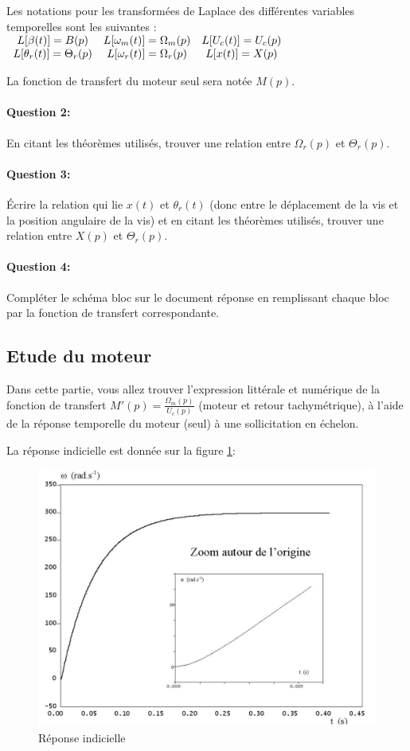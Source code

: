 Les notations pour les transformées de Laplace des différentes variables temporelles sont les suivantes :
\begin{math}
\begin{array}{c c c}
L[\beta(t)]=B(p) &  L[\omega_m(t)]=\Omega_m(p) &  L[U_c(t)]=U_c(p) \\
L[\theta_r(t)]=\Theta_r(p) &  L[\omega_r(t)]=\Omega_r(p) &  L[x(t)]=X(p) \\
\end{array}
\end{math}

La fonction de transfert du moteur seul sera notée $M(p)$.

\paragraph{Question 2:} En citant les théorèmes utilisés, trouver une relation entre $\Omega_r(p)$ et $\Theta_r(p)$.

\paragraph{Question 3:} Écrire la relation qui lie $x(t)$ et $\theta_r(t)$ (donc entre le déplacement de la vis et la position angulaire de la vis) et en citant les théorèmes utilisés, trouver une relation entre $X(p)$ et $\Theta_r(p)$.

\paragraph{Question 4:} Compléter le schéma bloc sur le document réponse en remplissant chaque bloc par la fonction de transfert correspondante.

\subsection{Etude du moteur}

Dans cette partie, vous allez trouver l'expression littérale et numérique de la fonction de transfert $M'(p)=\frac{\Omega_m(p)}{U_c(p)}$ (moteur et retour tachymétrique), à l'aide de la réponse temporelle du moteur (seul) à une sollicitation en échelon.

La réponse indicielle est donnée sur la figure \ref{phare3}:

\begin{figure}[!h]
  \centering
  \includegraphics[width=0.6\linewidth]{img/phare3}
  \caption{Réponse indicielle}
  \label{phare3}
\end{figure}

